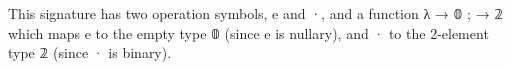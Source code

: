 \documentclass[a4paper,UKenglish,cleveref,autoref,thm-restate,11pt]{lipics-v2021}
\begin{document}
\begin{code}%
\>[0][@{}l@{\AgdaIndent{0}}]%
\>[1]\AgdaSpace{}%
\AgdaSpace{}%
\AgdaSymbol{:}\AgdaSpace{}%
\AgdaSpace{}%
\AgdaSpace{}%
\<%
\\
\>[1][@{}l@{\AgdaIndent{0}}]%
\>[2]\AgdaSpace{}%
\AgdaSymbol{:}\AgdaSpace{}%
\<%
\\
%
\>[2]\AgdaSpace{}%
\AgdaSymbol{:}\AgdaSpace{}%
\<%
\\
%
\\[\AgdaEmptyExtraSkip]%
%
\>[1]\AgdaSpace{}%
\AgdaSymbol{:}\AgdaSpace{}%
\AgdaSpace{}%
\AgdaSpace{}%
\<%
\\
%
\>[1]\AgdaSpace{}%
\AgdaSymbol{=}\AgdaSpace{}%
\AgdaSpace{}%
\AgdaOperator{\AgdaInductiveConstructor{,}}\AgdaSpace{}%
\AgdaSpace{}%
\AgdaSymbol{\{}\AgdaSpace{}%
\AgdaSpace{}%
\AgdaSpace{}%
\AgdaSymbol{;}\AgdaSpace{}%
\AgdaSpace{}%
\AgdaSpace{}%
\AgdaSpace{}%
\AgdaSymbol{\}}\<%
\end{code}
\ccpad
This signature has two operation symbols, \aic e and \aic ·, and a function \as λ \as{\{}  \as → \af 𝟘 \as ;  \as → \af 𝟚 \as{\}} which maps \aic e to the empty type \af 𝟘 (since \aic e is nullary), and \aic · to the 2-element type \af 𝟚 (since \aic · is binary).








\newcommand\sigOV{\AgdaFunction{Signature}\AgdaSpace{}\AgdaBound{𝓞}\AgdaSpace{}\AgdaBound{𝓥}\xspace}
\end{document}

